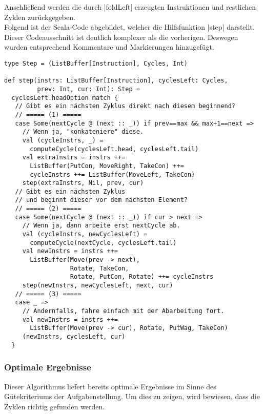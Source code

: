 Anschließend werden die durch |foldLeft| erzeugten Instruktionen und restlichen Zyklen zurück\-ge\-ge\-ben.\\
Folgend ist der Scala-Code abgebildet, welcher die Hilfsfunktion |step| darstellt.
Dieser Codeausschnitt ist deutlich komplexer als die vorherigen. Deswegen wurden entsprechend Kommentare und Markierungen hinzugefügt.
\lstset{basicstyle=\ttfamily}
\begin{lstlisting}
type Step = (ListBuffer[Instruction], Cycles, Int)

def step(instrs: ListBuffer[Instruction], cyclesLeft: Cycles,
         prev: Int, cur: Int): Step =
  cyclesLeft.headOption match {
   // Gibt es ein nächsten Zyklus direkt nach diesem beginnend?
   // ===== (1) =====
   case Some(nextCycle @ (next :: _)) if prev==max && max+1==next =>
     // Wenn ja, "konkateniere" diese.
     val (cycleInstrs, _) =
       computeCycle(cyclesLeft.head, cyclesLeft.tail)
     val extraInstrs = instrs ++=
       ListBuffer(PutCon, MoveRight, TakeCon) ++=
       cycleInstrs ++= ListBuffer(MoveLeft, TakeCon)
     step(extraInstrs, Nil, prev, cur)
   // Gibt es ein nächsten Zyklus
   // und beginnt dieser vor dem nächsten Element?
   // ===== (2) =====
   case Some(nextCycle @ (next :: _)) if cur > next =>
     // Wenn ja, dann arbeite erst nextCycle ab.
     val (cycleInstrs, newCyclesLeft) =
       computeCycle(nextCycle, cyclesLeft.tail)
     val newInstrs = instrs ++=
       ListBuffer(Move(prev -> next),
                  Rotate, TakeCon,
                  Rotate, PutCon, Rotate) ++= cycleInstrs
     step(newInstrs, newCyclesLeft, next, cur)
   // ===== (3) =====
   case _ =>
     // Andernfalls, fahre einfach mit der Abarbeitung fort.
     val newInstrs = instrs ++=
       ListBuffer(Move(prev -> cur), Rotate, PutWag, TakeCon)
     (newInstrs, cyclesLeft, cur)
  }
\end{lstlisting}
\lstset{basicstyle=\ttfamily}

\subsubsection{Optimale Ergebnisse}
\label{opt_res}
Dieser Algorithmus liefert bereits optimale Ergebnisse im Sinne des Güte\-kri\-ter\-iums der Aufgabenstellung.
Um dies zu zeigen, wird bewiesen, dass die Zyklen richtig gefunden werden.
